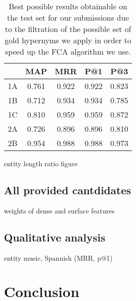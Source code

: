 \documentclass[11pt,a4paper]{article}
\begin{document}
\begin{table}
	\centering
	\begin{tabular}{c|cccc}
		   & MAP & MRR & P@1  & P@3 \\ \hline
		1A & 0.761 & 0.922 & 0.922 & 0.823 \\
		1B & 0.712 & 0.934 & 0.934 & 0.785 \\
		1C & 0.810 & 0.959 & 0.959 & 0.872 \\
		2A & 0.726 & 0.896 & 0.896 & 0.810 \\
		2B & 0.954 & 0.988 & 0.988 & 0.973 \\
	\end{tabular}
	\caption{Best possible results obtainable on the test set for our
submissions due to the filtration of the possible set of gold hypernyms
we apply in order to speed up the FCA algorithm we use.}
	\label{table:upper}
\end{table}

entity length ratio figure %

\subsection{All provided cantdidates}

weights of dense and surface features %

\subsection{Qualitative analysis} %

entity music, Spannish (MRR, p@1)

\section{Conclusion}



\end{document}

